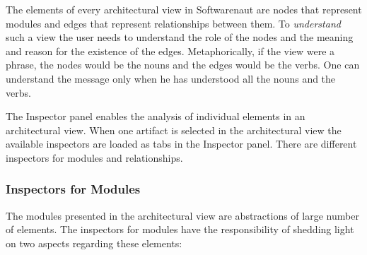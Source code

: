 \documentclass[preprint,12pt]{elsarticle}
\newcommand\on[1]{\nbc{ON}{#1}{red}} %
\begin{document}
The elements of every architectural view in Softwarenaut are nodes that represent modules and edges that represent relationships between them. To {\em understand} such a view the user needs to understand the role of the nodes and the meaning and reason for the existence of the edges. Metaphorically, if the view were a phrase, the nodes would be the nouns and the edges would be the verbs. One can understand the message only when he has understood all the nouns and the verbs.

The Inspector panel enables the analysis of individual elements in an architectural view. When one artifact is selected in the architectural view the available inspectors are loaded as tabs in the Inspector panel. There are different inspectors for modules and relationships. 



\subsubsection {Inspectors for Modules}

The modules presented in the architectural view are abstractions of large number of elements. The inspectors for modules have the responsibility of shedding light on two aspects regarding these elements:

\end{document}
